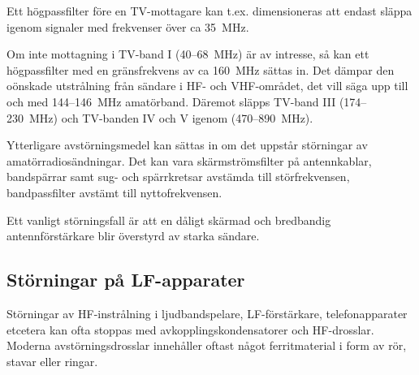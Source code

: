 Ett högpassfilter före en TV-mottagare kan t.ex. dimensioneras att endast släppa
igenom signaler med frekvenser över ca 35~MHz.

Om inte mottagning i TV-band I (40--68~MHz) är av intresse, så kan ett
högpassfilter med en gränsfrekvens av ca 160~MHz sättas in.
Det dämpar den oönskade utstrålning från sändare i HF- och VHF-området,
det vill säga upp till och med 144--146~MHz amatörband.
Däremot släpps TV-band III (174--230~MHz) och TV-banden IV och V igenom
(470--890~MHz).

Ytterligare avstörningsmedel kan sättas in om det uppstår störningar av
amatörradiosändningar.
Det kan vara skärmströmsfilter på antennkablar, bandspärrar samt sug- och
spärrkretsar avstämda till störfrekvensen, bandpassfilter avstämt till
nyttofrekvensen.

Ett vanligt störningsfall är att en dåligt skärmad och bredbandig
antennförstärkare blir överstyrd av starka sändare.

\subsection{Störningar på LF-apparater}

Störningar av HF-instrålning i ljudbandspelare, LF-förstärkare, telefonapparater
etcetera kan ofta stoppas med avkopplingskondensatorer och HF-drosslar.
Moderna avstörningsdrosslar innehåller oftast något ferritmaterial i form av
rör, stavar eller ringar.
